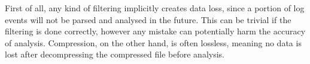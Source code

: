 \documentclass[runningheads]{llncs}
\begin{document}
First of all, any kind of filtering implicitly creates data loss, since a portion of log events will not be parsed and analysed in the future. This can be trivial if the filtering is done correctly, however any mistake can potentially harm the accuracy of analysis\cite{losslessCompression}. Compression, on the other hand, is often lossless, meaning no data is lost after decompressing the compressed file before analysis. 










%
%
%
%
%


%




\end{document}
